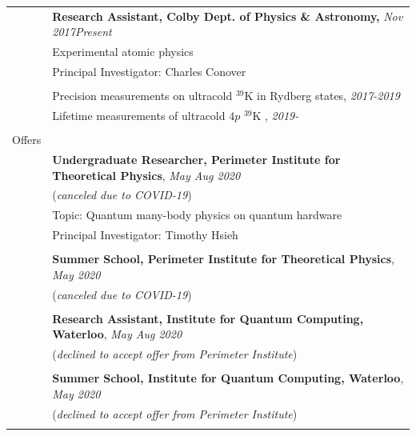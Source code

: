 \documentclass[10pt]{article}
\begin{document}
\begin{longtable}{ l m{13.5cm}   }
     					 
     					& \textbf{Research Assistant, Colby Dept. of Physics \& Astronomy,} \textit{Nov 2017\textendash Present }\\
     					& Experimental atomic physics \\
     					& Principal Investigator: Charles Conover \\ \vspace{-9pt}
     					& \\
     					& Precision measurements on ultracold $^{\text{39}}$K in Rydberg states, \textit{2017-2019} \\
     					& Lifetime measurements of ultracold $4p$ $^{\text{39}}$K , \textit{2019-}\\
     					& \\
     					
     					
     					
   \large{Offers} 		&\\
   						& \textbf{Undergraduate Researcher, Perimeter Institute for Theoretical Physics}, \textit{May \textendash Aug 2020}\\
   						&(\textit{canceled due to COVID-19})\\
   						& Topic: Quantum many-body physics on quantum hardware \\
   						& Principal Investigator: Timothy Hsieh \\
   						& \\
   						
   						
   						& \textbf{Summer School, Perimeter Institute for Theoretical Physics}, \textit{May 2020}\\
   						&(\textit{canceled due to COVID-19})\\
   						& \\
   						
   						
   						
   						
   						& \textbf{Research Assistant, Institute for Quantum Computing, Waterloo}, \textit{May \textendash Aug 2020}\\
   						&(\textit{declined to accept offer from Perimeter Institute})\\
   						&\\
   						
   						
   						& \textbf{Summer School, Institute for Quantum Computing, Waterloo}, \textit{May 2020}\\
   						&(\textit{declined to accept offer from Perimeter Institute})\\
   						&\\
   						

\end{longtable}
\end{document}
